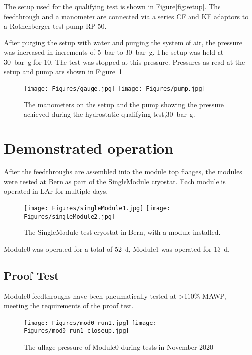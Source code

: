 \documentclass[a4paper]{article}
\begin{document}
The setup used for the qualifying test is shown in Figure\ref{fig:setup}.
The feedthrough and a manometer are connected via a series CF and KF adaptors to a Rothenberger test pump RP 50.

After purging the setup with water and purging the system of air, the pressure was increased in increments of \SI{5}{\bar} to \SI{30}{\bar\g}.    
The setup was held at \SI{30}{\bar\g} for \SI{10}{\min}.
The test was stopped at this pressure. 
Pressures as read at the setup and pump are shown in Figure~\ref{fig:pressure}   

\begin{figure}[htbp]
	\centering
	\texttt{[image: Figures/gauge.jpg]}
	\texttt{[image: Figures/pump.jpg]}
	\caption{The manometers on the setup and the pump showing the pressure achieved during the hydrostatic qualifying test,\SI{30}{\bar\g}.}
	\label{fig:pressure}
\end{figure}

\section{Demonstrated operation}

After the feedthroughs are assembled into the module top flanges, the modules were tested at Bern as part of the SingleModule cryostat.
Each module is operated in LAr for multiple days.

\begin{figure}[htbp]
	\centering
	\texttt{[image: Figures/singleModule1.jpg]}
	\texttt{[image: Figures/singleModule2.jpg]}
	\caption{The SingleModule test cryostat in Bern, with a module installed.}
	\label{fig:singlemodule}
\end{figure}

Module0 was operated for a total of \SI{52}{\day}, Module1 was operated for \SI{13}{\day}.

\subsection{Proof Test}

Module0 feedthroughs have been pneumatically tested at >110\% MAWP, meeting the requirements of the proof test.

\begin{figure}[htbp]
	\centering
	\texttt{[image: Figures/mod0\_run1.jpg]}
	\texttt{[image: Figures/mod0\_run1\_closeup.jpg]}
	\caption{The ullage pressure of Module0 during tests in November 2020}
	\label{fig:ullage_mod0}
\end{figure}
\end{document}
